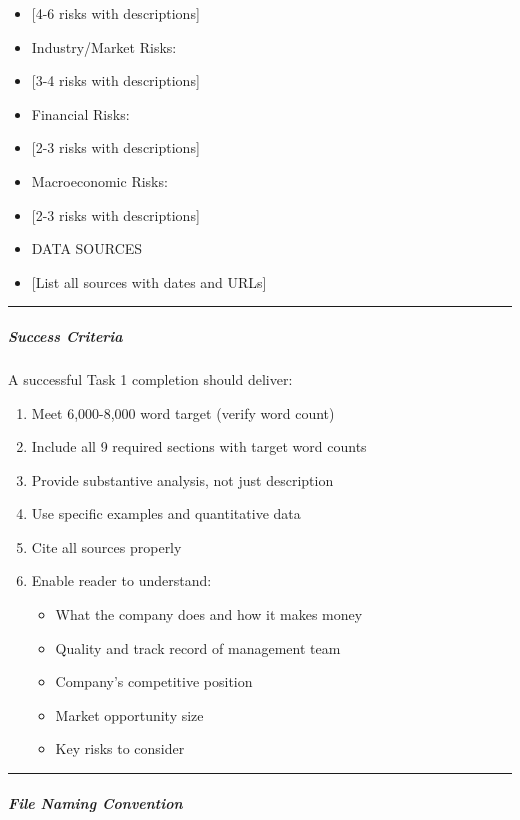 \documentclass[11pt]{article}
\begin{document}
\begin{itemize}[leftmargin=*,itemsep=2pt,topsep=2pt]
\item {} [4-6 risks with descriptions]
\item {} Industry/Market Risks:
\item {} [3-4 risks with descriptions]
\item {} Financial Risks:
\item {} [2-3 risks with descriptions]
\item {} Macroeconomic Risks:
\item {} [2-3 risks with descriptions]
\item {} DATA SOURCES
\item {} [List all sources with dates and URLs]
\end{itemize}

\vspace{0.5em}\hrule\vspace{0.5em}

\subparagraph{Success Criteria}\mbox{}\par

A successful Task 1 completion should deliver:


\begin{enumerate}[leftmargin=*,itemsep=2pt,topsep=2pt]
\item {} Meet 6,000-8,000 word target (verify word count)
\item {} Include all 9 required sections with target word counts
\item {} Provide substantive analysis, not just description
\item {} Use specific examples and quantitative data
\item {} Cite all sources properly
\item {} Enable reader to understand:
\begin{itemize}[leftmargin=*,itemsep=2pt,topsep=2pt]
\item {} What the company does and how it makes money
\item {} Quality and track record of management team
\item {} Company's competitive position
\item {} Market opportunity size
\item {} Key risks to consider
\end{itemize}
\end{enumerate}

\vspace{0.5em}\hrule\vspace{0.5em}

\subparagraph{File Naming Convention}\mbox{}\par
\end{document}
